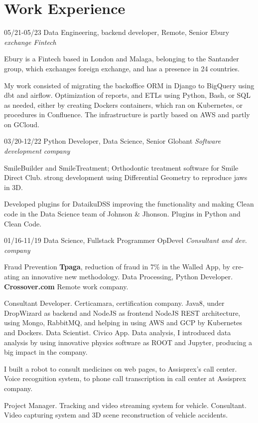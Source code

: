 \section{Work Experience}

\begin{entrylist}
  \entry
    {05/21-05/23}       
    {Data Engineering, backend developer, Remote, Senior}
    {Ebury {\sl exchange Fintech}}
    {Ebury is a Fintech based in London and Malaga, belonging to the Santander group, which exchanges
foreign exchange, and has a presence in 24 countries.

My work consisted of migrating the backoffice ORM in Django to BigQuery using dbt and airflow. Optimization of reports, and ETLs
using Python, Bash, or SQL as needed, either by creating Dockers containers, which ran on Kubernetes, or procedures in Confluence.
The infrastructure is partly based on AWS and partly on GCloud.}
  \entry
    {03/20-12/22}
    {Python Developer, Data Science, Senior}
    {Globant {\sl Software development company}}
    {SmileBuilder and SmileTreatment; Orthodontic treatment software for Smile Direct Club. strong development using Differential Geometry to reproduce jaws in 3D.

Developed plugins for DataikuDSS improving the functionality and making
Clean code in the Data Science team of Johnson \& Jhonson. Plugins in Python and Clean Code.}

  \entry
    {01/16-11/19}
    {Data Science, Fullstack Programmer}
    {OpDevel {\sl Consultant and dev. company}}
    {Fraud Prevention \textbf{Tpaga}, reduction of fraud in 7\% in the Walled App, by cre-
ating an innovative new methodology. Data Processing, Python Developer. \textbf{Crossover.com} Remote work company.

Consultant Developer. Certicamara, certification company. Java8, under
DropWizard as backend and NodeJS as frontend NodeJS REST architecture,
using Mongo, RabbitMQ, and helping in using AWS and GCP by Kubernetes
and Dockers. Data Scientist. Civico App. Data analysis, I introduced data analysis by using
innovative physics software as ROOT and Jupyter, producing a big impact in
the company.

I built a robot to consult medicines on web pages, to Assisprex’s call center.
Voice recognition system, to phone call transcription in call center at Assisprex company.

Project Manager. Tracking and video streaming system for vehicle.
Consultant. Video capturing system and 3D scene reconstruction of vehicle
accidents.

}
\end{entrylist}
